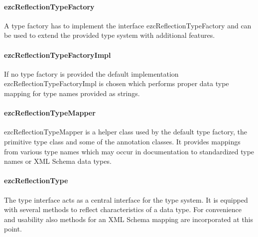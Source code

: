\documentclass[10pt,final,a4paper,oneside]{article}
\begin{document}
\paragraph{ezcReflectionTypeFactory}
A type factory has to implement the interface
ezcReflectionTypeFactory
and can be used to extend the provided type system
with additional features.

\paragraph{ezcReflectionTypeFactoryImpl}
If no type factory is provided
the default implementation ezcReflectionTypeFactoryImpl is chosen
which performs proper data type mapping
for type names provided as strings.


\paragraph{ezcReflectionTypeMapper}
ezcReflectionTypeMapper is a helper class
used by the default type factory,
the primitive type class
and some of the annotation classes.
It provides mappings from various type names
which may occur in documentation
to standardized type names
or XML Schema data types.

\paragraph{ezcReflectionType}
The type interface acts as a
central interface for the type system.
It is equipped with several methods
to reflect characteristics of a data type.
For convenience and usability
also methods for an XML Schema mapping
are incorporated at this point.

\end{document}
